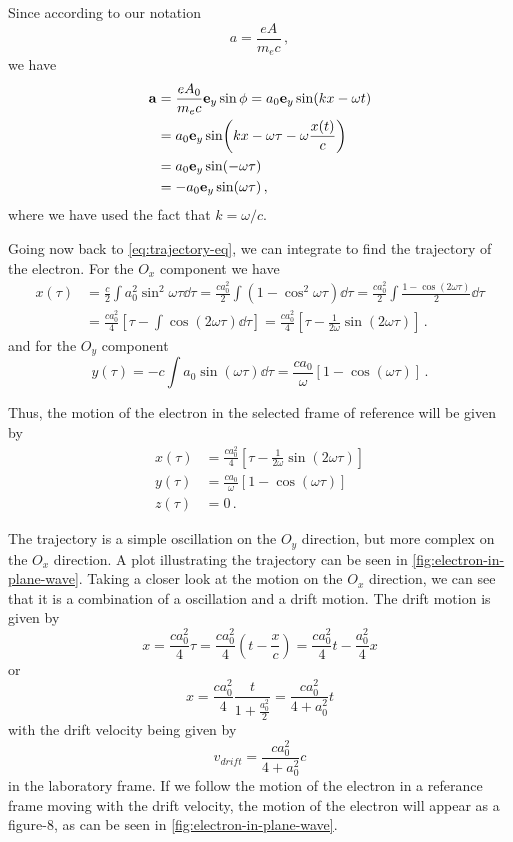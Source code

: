 \documentclass[12pt, class=report, crop=false]{standalone}
\begin{document}
Since according to our notation
\[
a=\frac{e A}{m_e c}\,,
\]
we have
\[
\begin{aligned}
  \vb{a} &= \frac{e A_0}{m_e c}\vb{e}_y\sin{\phi} =
  a_0 \vb{e}_y \sin(kx -\omega t)\\ &=
  a_0 \vb{e}_y \sin(kx - \omega\tau - \omega\frac{x(t)}{c}) \\ &=
  a_0 \vb{e}_y \sin(-\omega \tau) \\ &=
 -a_0 \vb{e}_y \sin(\omega\tau)\,,
\end{aligned}
\]
where we have used the fact that \(k=\omega/c\).

Going now back to \cref{eq:trajectory-eq}, we can integrate to find the trajectory
of the electron. For the \(O_x\) component we have
\[
\begin{aligned}
  x(\tau) &= \frac{c}{2}\int a_0^2 \sin^2 \omega\tau \dd{\tau} =
  \frac{c a_0^2}{2}\int \left(1-\cos^2\omega\tau\right)\dd{\tau} =
  \frac{c a_0^2}{2}\int \frac{1-\cos(2\omega\tau)}{2}\dd{\tau} \\&=
  \frac{c a_0^2}{4}\left[\tau - \int \cos(2\omega\tau)\dd{\tau}\right] =
  \frac{c a_0^2}{4}\left[\tau - \frac{1}{2\omega}\sin(2\omega\tau)\right]\,.
\end{aligned}
\]
and for the \(O_y\) component
\[
y(\tau) = -c \int a_0 \sin(\omega\tau)\dd{\tau} = \frac{c a_0}{\omega}
\left[1 - \cos(\omega\tau)\right]\,.
\]

Thus, the motion of the electron in the selected frame of reference will be
given by
\[
\begin{aligned}
  x(\tau) &= \frac{c a_0^2}{4}\left[\tau - \frac{1}{2\omega}\sin(2\omega\tau)\right]\\
  y(\tau) &= \frac{c a_0}{\omega} \left[1 - \cos(\omega\tau)\right]\\
  z(\tau) &= 0\,.
\end{aligned}
\]

The trajectory is a simple oscillation on the \(O_y\) direction, but more complex
on the \(O_x\) direction. A plot illustrating the trajectory can be seen
in \cref{fig:electron-in-plane-wave}. Taking a closer look at the motion on the
\(O_x\) direction, we can see that it is a combination of a oscillation and
a drift motion. The drift motion is given by
\[
x = \frac{c a_0^2}{4} \tau = \frac{c a_0^2}{4} (t - \frac{x}{c}) =
\frac{c a_0^2}{4}t - \frac{a_0^2}{4}x
\]
or
\[
x = \frac{c a_0^2}{4} \frac{t}{1+\frac{a_0^2}{2}} = \frac{c a_0^2}{4+a_0^2}t
\]
with the drift velocity being given by
\[
v_{drift} = \frac{c a_0^2}{4+a_0^2}c
\]
in the laboratory frame. If we follow the motion of the electron in a referance
frame moving with the drift velocity, the motion of the electron will appear
as a figure-8, as can be seen in \cref{fig:electron-in-plane-wave}.
\end{document}
